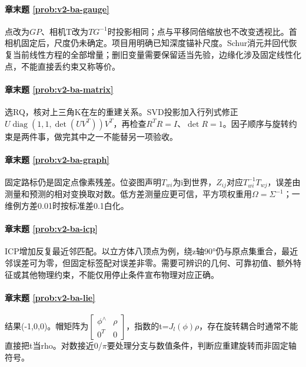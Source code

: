 \paragraph*{章末题 \ref{prob:v2-ba-gauge}}
\begin{solution}
点改为$GP$、相机T改为$TG^{-1}$时投影相同；点与平移同倍缩放也不改变透视比。首相机固定后，尺度仍未确定。项目用明确已知深度锚补尺度。Schur消元并回代恢复当前线性方程的全部增量；删旧变量需要保留适当先验，边缘化涉及固定线性化点，不能直接丢约束又称等价。
\end{solution}

\paragraph*{章末题 \ref{prob:v2-ba-matrix}}
\begin{solution}
选RQ，核对上三角K在左的重建关系。SVD投影加入行列式修正$U\operatorname{diag}(1,1,\det(UV^T))V^T$，再检查$R^TR=I$、$\det R=1$。因子顺序与旋转约束是两件事，做完其中之一不能替另一项验收。
\end{solution}

\paragraph*{章末题 \ref{prob:v2-ba-graph}}
\begin{solution}
固定路标仍是固定点像素残差。位姿图声明$T_{wi}$为i到世界，$Z_{ij}$对应$T_{wi}^{-1}T_{wj}$，误差由测量和预测的相对变换取对数。低方差测量应更可信，平方项权重用$\Omega=\Sigma^{-1}$；一维例方差0.01时按标准差0.1白化。
\end{solution}

\paragraph*{章末题 \ref{prob:v2-ba-icp}}
\begin{solution}
ICP增加反复最近邻匹配。以立方体八顶点为例，绕z轴90°仍与原点集重合，最近邻误差可为零，但固定标签配对误差非零。需要可辨识的几何、可靠初值、额外特征或其他物理约束，不能仅用停止条件宣布物理对应正确。
\end{solution}

\paragraph*{章末题 \ref{prob:v2-ba-lie}}
\begin{solution}
结果(-1,0,0)。帽矩阵为$\left[\begin{smallmatrix}\phi^\wedge&\rho\\0^T&0\end{smallmatrix}\right]$，指数的t=$J_l(\phi)\rho$，存在旋转耦合时通常不能直接把t当rho。对数接近0/$\pi$要处理分支与数值条件，判断应重建旋转而非固定轴符号。
\end{solution}

